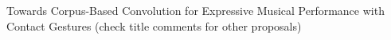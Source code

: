 Towards Corpus-Based Convolution for Expressive Musical Performance with Contact Gestures (check title comments for other proposals)